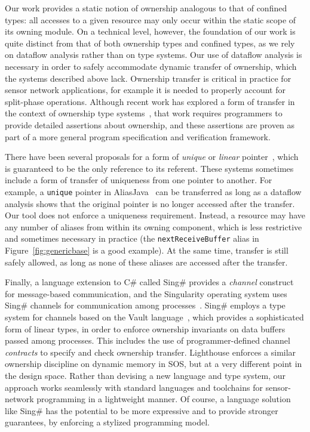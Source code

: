 Our work provides a static notion of ownership analogous to that of
confined types:  all accesses to a given resource may only occur
within the static scope of its owning module.  On a technical level,
however, the foundation of our work is quite distinct from that of
both ownership types and confined types, as we rely on dataflow
analysis rather than on type systems.  Our use of dataflow analysis is
necessary in order to safely accommodate dynamic transfer of
ownership, which the systems described above lack.  Ownership transfer
is critical in practice for sensor network applications, for example
it is needed 
to properly account for split-phase operations.  Although recent work
has explored a form of transfer in the context of ownership type
systems~\cite{DBLP:conf/ecoop/BanerjeeN05}, that work requires
programmers to provide detailed assertions about ownership, and these
assertions are proven as part of a more general program specification
and verification framework.


There have been several proposals for a form of {\em unique}
or {\em linear}
pointer~\cite{Boyland:2001:ABU,aliasjava,Wad90:linear},
which is guaranteed to be the only reference to its referent.  These
systems sometimes include a form of transfer of uniqueness from one
pointer to another.  For example, a {\tt unique} pointer in
AliasJava~\cite{aliasjava} can be transferred as long as a dataflow
analysis shows that the original pointer is no longer accessed after
the transfer.  Our tool does not enforce a uniqueness requirement.
Instead, a resource may have any number of
aliases from within its owning component, which is less restrictive
and sometimes necessary in practice (the {\tt nextReceiveBuffer} alias
in Figure~\ref{fig:genericbase} is a good example).  
At the same time, transfer is still safely 
allowed, as long as none of these aliases are accessed after the
transfer.

Finally, a language extension to C\#
called Sing\# provides a {\em channel} construct
for message-based communication, and
the Singularity operating system uses Sing\# channels for communication among
processes~\cite{fahndrich06language}.  
Sing\#
employs a 
type system for channels based on the 
Vault language~\cite{Vault,adoption-focus}, which provides a
sophisticated form of linear types, in order to enforce ownership
invariants on data buffers passed among processes.  This includes the
use of programmer-defined channel {\em contracts} to specify and check
ownership transfer.
Lighthouse enforces a similar ownership discipline on dynamic memory
in SOS, but at a very different point in the design space.  Rather
than devising a new 
language and type system, our approach works seamlessly with
standard languages and toolchains for sensor-network programming in
a lightweight manner.  Of course, a language solution like Sing\# has
the potential to be more expressive and to provide stronger
guarantees, by enforcing a stylized programming model.



